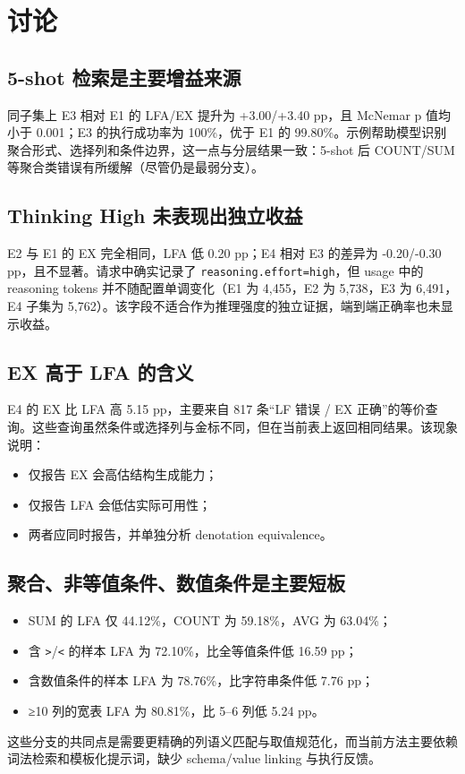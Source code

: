 \documentclass[conference]{IEEEtran}
\begin{document}
\section{讨论}
\subsection{5-shot 检索是主要增益来源}
同子集上 E3 相对 E1 的 LFA/EX 提升为 +3.00/+3.40 pp，且 McNemar p 值均小于 0.001；E3 的执行成功率为 100\%，优于 E1 的 99.80\%。示例帮助模型识别聚合形式、选择列和条件边界，这一点与分层结果一致：5-shot 后 COUNT/SUM 等聚合类错误有所缓解（尽管仍是最弱分支）。
\subsection{Thinking High 未表现出独立收益}
E2 与 E1 的 EX 完全相同，LFA 低 0.20 pp；E4 相对 E3 的差异为 -0.20/-0.30 pp，且不显著。请求中确实记录了 \texttt{reasoning.effort=high}，但 usage 中的 reasoning tokens 并不随配置单调变化（E1 为 4,455，E2 为 5,738，E3 为 6,491，E4 子集为 5,762）。该字段不适合作为推理强度的独立证据，端到端正确率也未显示收益。
\subsection{EX 高于 LFA 的含义}
E4 的 EX 比 LFA 高 5.15 pp，主要来自 817 条“LF 错误 / EX 正确”的等价查询。这些查询虽然条件或选择列与金标不同，但在当前表上返回相同结果。该现象说明：
\begin{itemize}
\item 仅报告 EX 会高估结构生成能力；
\item 仅报告 LFA 会低估实际可用性；
\item 两者应同时报告，并单独分析 denotation equivalence。
\end{itemize}
\subsection{聚合、非等值条件、数值条件是主要短板}
\begin{itemize}
\item SUM 的 LFA 仅 44.12\%，COUNT 为 59.18\%，AVG 为 63.04\%；
\item 含 \texttt{\textgreater{}}/\texttt{\textless{}} 的样本 LFA 为 72.10\%，比全等值条件低 16.59 pp；
\item 含数值条件的样本 LFA 为 78.76\%，比字符串条件低 7.76 pp；
\item ≥10 列的宽表 LFA 为 80.81\%，比 5–6 列低 5.24 pp。
\end{itemize}
这些分支的共同点是需要更精确的列语义匹配与取值规范化，而当前方法主要依赖词法检索和模板化提示词，缺少 schema/value linking 与执行反馈。
\end{document}

